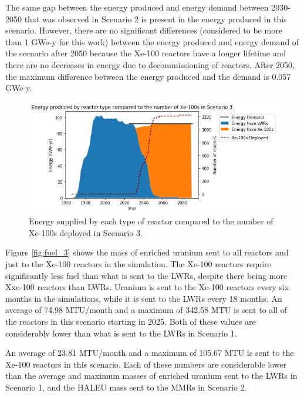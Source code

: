 The same gap between the energy produced and energy demand between 
2030-2050 that was observed in Scenario 2 is present in the energy produced 
in this scenario. However, there are no significant 
differences (considered to be more than 1 GWe-y for this work) between the energy 
produced and energy demand of the scenario 
after 2050 because the Xe-100 reactors have a longer lifetime and there are 
no decreases in energy due to decommissioning of reactors. After 2050, the 
maximum difference between the energy produced and the demand is 0.057 GWe-y. 

\begin{figure}
    \centering 
    \includegraphics[scale=0.5]{figures/energy_scenario3.png}
    \caption{Energy supplied by each type of reactor compared to the number of 
    Xe-100s deployed in Scenario 3.}
    \label{fig:energy_rx_3}
\end{figure}

Figure \ref{fig:fuel_3} shows the mass of enriched uranium sent to all reactors and 
just to the Xe-100 reactors in the simulation. The Xe-100 reactors 
require significantly less fuel than what is sent to the \glspl{LWR}, 
despite there being more Xxe-100 reactors than \glspl{LWR}. Uranium 
is sent to the Xe-100 reactors every six months in the simulations, 
while it is sent to the \glspl{LWR} every 18 months. An average of 
74.98 MTU/month and a maximum of 342.58 MTU is sent to all of the reactors 
in this scenario starting in 2025. Both of these values are considerably
lower than what is sent to the \glspl{LWR} in Scenario 1.

An average of 23.81 
MTU/month and a maximum of 105.67 MTU is sent to the Xe-100 reactors in 
this scenario. Each of these numbers are considerable lower than the 
average and maximum masses of enriched uranium sent to the \glspl{LWR} 
in Scenario 1, and the \gls{HALEU} mass sent to the \glspl{MMR} in 
Scenario 2. 

